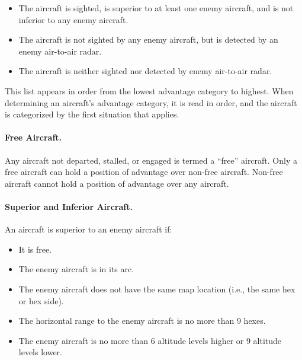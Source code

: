 {\begin{itemize}
    \item{} 
    The aircraft is sighted, is superior to at least one enemy aircraft, and is not inferior to any enemy aircraft.

    \item{} The aircraft is not sighted by any enemy aircraft, but is detected by an enemy air-to-air radar.

    \item{} The aircraft is neither sighted nor detected by enemy air-to-air radar.

\end{itemize}

\Ax{
    
}

This list appears in order from the lowest advantage category to highest. When determining an aircraft’s advantage category, it is read in order, and the aircraft is categorized by the first situation that applies. 

\paragraph{Free Aircraft.} Any aircraft not departed, stalled, or engaged is termed a “free” aircraft. Only a free aircraft can hold a position of advantage over non-free aircraft. Non-free aircraft cannot hold a position of advantage over any aircraft.


\paragraph{Superior and Inferior Aircraft.} An aircraft is superior to an enemy aircraft if:
\begin{itemize}
    \item It is free.
    \item The enemy aircraft is in its  arc.
    \item The enemy aircraft does not have the same map location (i.e., the same hex or hex side).
    \item The horizontal range to the enemy aircraft is no more than 9 hexes.
    \item The enemy aircraft is no more than 6 altitude levels higher or 9 altitude levels lower.
\end{itemize}

}
